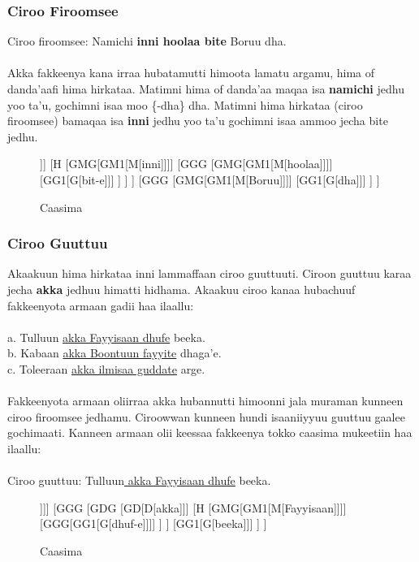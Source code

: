 \documentclass[11pt,b5paper]{book}
\begin{document}
\subsubsection{Ciroo Firoomsee}

Ciroo firoomsee: Namichi \textbf{inni hoolaa bite} Boruu dha.\\
\\
Akka fakkeenya kana irraa hubatamutti himoota lamatu argamu, hima of danda’aafi hima hirkataa. Matimni hima of danda’aa maqaa isa \textbf{namichi} jedhu yoo ta’u, gochimni isaa moo \{-dha\} dha. Matimni hima hirkataa (ciroo firoomsee) bamaqaa isa \textbf{inni} jedhu yoo ta’u gochimni isaa ammoo jecha
bite jedhu.

\begin{figure}[H]
	\caption{Caasima}
	\centering
	\begin{forest}
		[H
			[GMG
				[GM1[M[Namichi]]]
				[H
					[GMG[GM1[M[inni]]]]
					[GGG
						[GMG[GM1[M[hoolaa]]]]
						[GG1[G[bit-e]]]
					]
				]
			]
			[GGG
				[GMG[GM1[M[Boruu]]]]
				[GG1[G[dha]]]
			]
		]
	\end{forest}
\end{figure}

\subsubsection{Ciroo Guuttuu}

Akaakuun hima hirkataa inni lammaffaan ciroo guuttuuti. Ciroon guuttuu karaa jecha \textbf{akka} jedhuu himatti hidhama. Akaakuu ciroo kanaa hubachuuf fakkeenyota armaan gadii haa ilaallu: \\
\\
a. Tulluun \underline{akka Fayyisaan dhufe} beeka.\\
b. Kabaan \underline{akka Boontuun fayyite} dhaga’e.\\
c. Toleeraan \underline{akka ilmisaa guddate} arge.\\
\\
Fakkeenyota armaan oliirraa akka hubannutti himoonni jala muraman kunneen ciroo firoomsee jedhamu. Ciroowwan kunneen hundi isaaniiyyuu guuttuu gaalee gochimaati. Kanneen armaan olii keessaa fakkeenya tokko caasima mukeetiin haa ilaallu: \\
\\
Ciroo guuttuu: Tulluun\underline{ akka Fayyisaan dhufe} beeka.

\begin{figure}[H]
	\caption{Caasima}
	\centering
	\begin{forest}
		[H
			[GMG[GM1[M[Tulluun]]]]
			[GGG				
				[GDG
					[GD[D[akka]]]
					[H
						[GMG[GM1[M[Fayyisaan]]]]
						[GGG[GG1[G[dhuf-e]]]]
					]
				]
				[GG1[G[beeka]]]
			]
		]
	\end{forest}
\end{figure}
\end{document}
